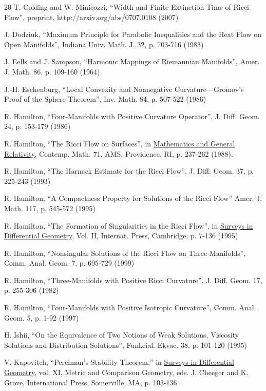 \documentclass[12pt]{amsart}
\numberwithin{equation}{section}
\theoremstyle{plain}
\theoremstyle{definition}
\theoremstyle{remark}
\begin{document}
\begin{thebibliography}{20}
 T. Colding and W. Minicozzi,
``Width and Finite Extinction Time of Ricci Flow'',
preprint, http://arxiv.org/abs/0707.0108 (2007)

 J. Dodziuk,  ``Maximum Principle for Parabolic 
Inequalities and the Heat Flow on Open Manifolds'',
Indiana Univ. Math. J. 32, p. 703-716 (1983)

 J. Eells and J. Sampson,
``Harmonic Mappings of Riemannian Manifolds'',
Amer. J. Math. 86, p. 109-160 (1964)

 J.-H. Eschenburg, ``Local Convexity and Nonnegative 
Curvature---Gromov's Proof of the Sphere Theorem'', 
Inv. Math. 84, p. 507-522 (1986)

 R. Hamilton,
``Four-Manifolds with Positive Curvature Operator'', 
J. Diff. Geom. 24, p. 153-179 (1986)

 R. Hamilton,
``The Ricci Flow on Surfaces'', in
\underline{Mathematics and General Relativity},
Contemp. Math. 71, 
AMS, Providence, RI, p. 237-262 (1988).

 R. Hamilton,
``The Harnack Estimate for the Ricci Flow'', 
J. Diff. Geom. 37, p. 225-243 (1993)

 R. Hamilton,
``A Compactness Property for Solutions of the Ricci Flow''
Amer. J. Math. 117, p. 545-572 (1995)

 R. Hamilton,
``The Formation of Singularities in the Ricci Flow'', in
\underline{Surveys in Differential Geometry}, Vol. II,
Internat. Press, Cambridge, p. 7-136 (1995) 

 R. Hamilton,
``Nonsingular Solutions of the Ricci Flow on Three-Manifolds'',
Comm. Anal. Geom. 7, p. 695-729 (1999)

 R. Hamilton,
``Three-Manifolds with Positive Ricci Curvature'', 
J. Diff. Geom. 17, p. 255-306 (1982)

 R. Hamilton, 
``Four-Manifolds with Positive Isotropic Curvature'', 
Comm. Anal. Geom. 5, p. 1-92 (1997)

 H. Ishii,
``On the Equivalence of Two Notions of Weak Solutions, Viscosity Solutions 
and Distribution Solutions'',
Funkcial. Ekvac. 38, p. 101-120 (1995)

 V. Kapovitch, ``Perelman's Stability
Theorem,'' in \underline{Surveys in Differential Geometry},
vol. XI, Metric and Comparison Geometry, eds. J. Cheeger and
K. Grove, International Press, Somerville, MA, p. 103-136


\end{thebibliography}
\end{document}

